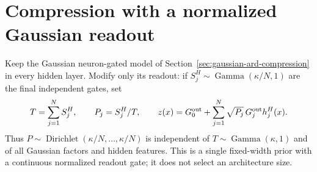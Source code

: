 \section{Compression with a normalized Gaussian readout}
\label{sec:normalized-readout-compression}
Keep the Gaussian neuron-gated model of Section~\ref{sec:gaussian-ard-compression} in every hidden layer. Modify only its readout: if $S_j^H\sim\operatorname{Gamma}(\kappa/N,1)$ are the final independent gates, set
\[
 T=\sum_{j=1}^NS_j^H,\qquad P_j=S_j^H/T,\qquad
 z(x)=G_0^{\rm out}+\sum_{j=1}^N\sqrt{P_j}\,G_j^{\rm out}h_j^H(x).
\]
Thus $P\sim\operatorname{Dirichlet}(\kappa/N,\ldots,\kappa/N)$ is independent of $T\sim\operatorname{Gamma}(\kappa,1)$ and of all Gaussian factors and hidden features. This is a single fixed-width prior with a continuous normalized readout gate; it does not select an architecture size.

